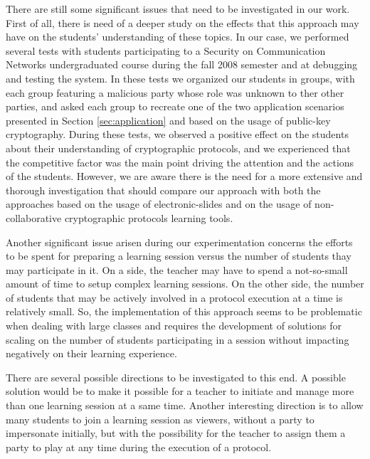 \documentclass[conference]{IEEEtran}
\begin{document}
There are still some significant issues that need to be
investigated in our work. First of all, there is need of a deeper study on
the effects that this approach may have on
the students' understanding of these topics. In our case, we performed
several tests with students participating to a Security on
Communication Networks undergraduated course during the fall 2008
semester and at debugging and testing the system. In these tests we
organized our students in groups, with each group featuring a
malicious party whose role was unknown to ther other parties, and
asked each group to recreate one of the two application scenarios
presented in Section \ref{sec:application} and based on the usage of public-key cryptography.
During these tests, we observed a positive effect on the students
about their understanding of cryptographic protocols, and we
experienced that the competitive factor was the main point driving the
attention and the actions of the students. However, we are aware there is the need
for a more extensive and thorough investigation that should compare
our approach with both the approaches based on the usage of
electronic-slides and on the usage of non-collaborative cryptographic
protocols learning tools.

Another significant issue arisen during our experimentation concerns the efforts
to be spent for preparing a learning session versus the number of
students thay may participate in it. On a side, the teacher may have
to spend a not-so-small amount of time to setup complex learning
sessions. On the other side, the number of students that may be
actively involved in a protocol execution at a time is relatively
small. So, the implementation of this approach seems to be problematic when dealing
with large classes and requires the development of solutions for
scaling on the number of students participating in a session without
impacting negatively on their learning experience.

There are several possible directions to be investigated to this
end. A possible solution would be to make it possible for a teacher to
initiate and manage more than one learning session at a same
time. Another interesting direction is to allow many students to join a learning
session as viewers, without a party to impersonate initially, but with
the possibility for the teacher to assign them a party to play at any
time during the execution of a protocol.



\end{document}

